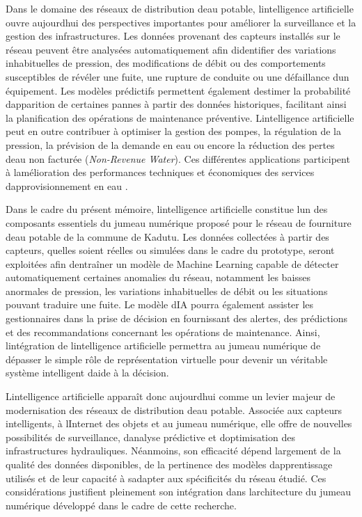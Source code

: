 \documentclass[12pt,a4paper,oneside]{report}
\begin{document}
Dans le domaine des réseaux de distribution d\textquotesingle eau
potable, l\textquotesingle intelligence artificielle ouvre
aujourd\textquotesingle hui des perspectives importantes pour améliorer
la surveillance et la gestion des infrastructures. Les données provenant
des capteurs installés sur le réseau peuvent être analysées
automatiquement afin d\textquotesingle identifier des variations
inhabituelles de pression, des modifications de débit ou des
comportements susceptibles de révéler une fuite, une rupture de conduite
ou une défaillance d\textquotesingle un équipement. Les modèles
prédictifs permettent également d\textquotesingle estimer la probabilité
d\textquotesingle apparition de certaines pannes à partir des données
historiques, facilitant ainsi la planification des opérations de
maintenance préventive. L\textquotesingle intelligence artificielle peut
en outre contribuer à optimiser la gestion des pompes, la régulation de
la pression, la prévision de la demande en eau ou encore la réduction
des pertes d\textquotesingle eau non facturée (\emph{Non-Revenue
Water}). Ces différentes applications participent à
l\textquotesingle amélioration des performances techniques et
économiques des services d\textquotesingle approvisionnement en eau
\cite{ref73}.

Dans le cadre du présent mémoire, l\textquotesingle intelligence
artificielle constitue l\textquotesingle un des composants essentiels du
jumeau numérique proposé pour le réseau de fourniture
d\textquotesingle eau potable de la commune de Kadutu. Les données
collectées à partir des capteurs, qu\textquotesingle elles soient
réelles ou simulées dans le cadre du prototype, seront exploitées afin
d\textquotesingle entraîner un modèle de Machine Learning capable de
détecter automatiquement certaines anomalies du réseau, notamment les
baisses anormales de pression, les variations inhabituelles de débit ou
les situations pouvant traduire une fuite. Le modèle
d\textquotesingle IA pourra également assister les gestionnaires dans la
prise de décision en fournissant des alertes, des prédictions et des
recommandations concernant les opérations de maintenance. Ainsi,
l\textquotesingle intégration de l\textquotesingle intelligence
artificielle permettra au jumeau numérique de dépasser le simple rôle de
représentation virtuelle pour devenir un véritable système intelligent
d\textquotesingle aide à la décision.

L\textquotesingle intelligence artificielle apparaît donc
aujourd\textquotesingle hui comme un levier majeur de modernisation des
réseaux de distribution d\textquotesingle eau potable. Associée aux
capteurs intelligents, à l\textquotesingle Internet des objets et au
jumeau numérique, elle offre de nouvelles possibilités de surveillance,
d\textquotesingle analyse prédictive et d\textquotesingle optimisation
des infrastructures hydrauliques. Néanmoins, son efficacité dépend
largement de la qualité des données disponibles, de la pertinence des
modèles d\textquotesingle apprentissage utilisés et de leur capacité à
s\textquotesingle adapter aux spécificités du réseau étudié. Ces
considérations justifient pleinement son intégration dans
l\textquotesingle architecture du jumeau numérique développé dans le
cadre de cette recherche.
\end{document}
